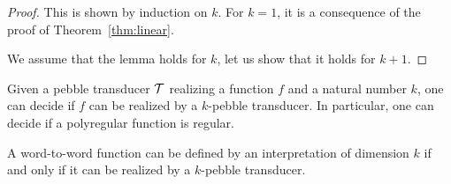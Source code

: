 \begin{proof}
    This is shown by induction on $k$.
    For $k=1$, it is a consequence of the proof of Theorem~\ref{thm:linear}.

    We assume that the lemma holds for $k$, let us show that it holds for $k+1$.
\end{proof}

\begin{theorem}
    Given a pebble transducer ${\mathcal T}$ realizing a function $f$ and a natural number $k$, one can decide if $f$ can be realized by a $k$-pebble transducer. In particular, one can decide if a polyregular function is regular.
\end{theorem}

\begin{corollary}
    A word-to-word function can be defined by an \mso interpretation of dimension $k$ if and only if it can be realized by a $k$-pebble transducer.
\end{corollary}